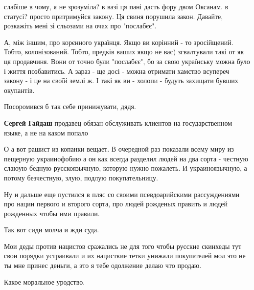 \begin{itemize}
\begin{itemize}
слабіше в чому, я не зрозуміла? в вазі ця пані дасть фору двом Оксанам. в
статусі? просто притримуйся закону. Ця свиня порушила закон. Давайте, розкажіть
мені зі сльозами на очах про "послабєє".

А, між іншим, про корєнного українця. Якщо ви корінний - то зросійщений. Тобто,
колонізований. Тобто, предків ваших якщо не вас) згвалтували такі от як ця
продавчиня. Вони от точно були "послабєє", бо за свою українську можна було і
життя позбавитись. А зараз - ще досі - можна отримати хамство всупереч закону -
і це на своїй землі ж. І такі як ви - холопи - будуть захищати бувших
окупантів.

Посоромився б так себе принижувати, дядя.

 
\textbf{Сергей Гайдаш} продавец обязан обслуживать клиентов на государственном языке, а не на каком попало

 

О а вот рашист из копанки вещает. В очередной раз показали всему миру из
пещерную украинофобию а он как всегда разделил людей на два сорта - честную
слаюую бедную русскоязычную, которую нужно пожалеть. И украиноязычную, а потому
безчестную, злую, подлую покупательницу.

Ну и дальше еще пустился в пляс со своими псевдоарийскими рассуждениями про
нации первого и второго сорта, про людей рожденых править и людей рожденных
чтобы ими правили.

Так вот сиди молча и жди суда.

Мои деды против нацистов сражались не для того чтобы русские скинхеды тут свои
порядки устраивали и их нацисткие тетки унижали покупателей мол это не ты мне
принес деньги, а это я тебе одолжение делаю что продаю.

Какое моральное уродство.

 


\end{itemize}
\end{itemize}
